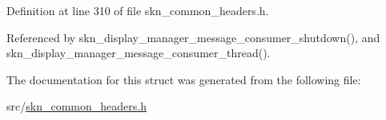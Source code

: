 Definition at line 310 of file skn\+\_\+common\+\_\+headers.\+h.



Referenced by skn\+\_\+display\+\_\+manager\+\_\+message\+\_\+consumer\+\_\+shutdown(), and skn\+\_\+display\+\_\+manager\+\_\+message\+\_\+consumer\+\_\+thread().



The documentation for this struct was generated from the following file\+:\begin{DoxyCompactItemize}
\item 
src/\hyperlink{skn__common__headers_8h}{skn\+\_\+common\+\_\+headers.\+h}\end{DoxyCompactItemize}
